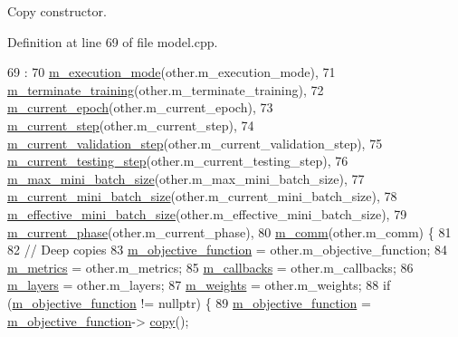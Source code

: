 Copy constructor. 

Definition at line 69 of file model.\+cpp.


\begin{DoxyCode}
69                                :
70   \hyperlink{classlbann_1_1model_a2166e2aad256a335ace3bdcae5da2614}{m\_execution\_mode}(other.m\_execution\_mode),
71   \hyperlink{classlbann_1_1model_a639f9c3fcb81b905085f8b1932f8920f}{m\_terminate\_training}(other.m\_terminate\_training),
72   \hyperlink{classlbann_1_1model_a305fac94b9063e59198c7f936923221a}{m\_current\_epoch}(other.m\_current\_epoch),
73   \hyperlink{classlbann_1_1model_af31a76afc53061747d2170a65e98f692}{m\_current\_step}(other.m\_current\_step),
74   \hyperlink{classlbann_1_1model_af69e5f6bf49a4990fd4c18984705ab87}{m\_current\_validation\_step}(other.m\_current\_validation\_step),
75   \hyperlink{classlbann_1_1model_a2acf043862ba878cb7a91cb0d26c3791}{m\_current\_testing\_step}(other.m\_current\_testing\_step),
76   \hyperlink{classlbann_1_1model_acc496503e7cf8d635e5a31ba09b3c81a}{m\_max\_mini\_batch\_size}(other.m\_max\_mini\_batch\_size),
77   \hyperlink{classlbann_1_1model_a982cea92d230bab5a47df504f02daf98}{m\_current\_mini\_batch\_size}(other.m\_current\_mini\_batch\_size),
78   \hyperlink{classlbann_1_1model_a4887fd2816e7c51b24cb8bf8e4a80a1c}{m\_effective\_mini\_batch\_size}(other.m\_effective\_mini\_batch\_size),
79   \hyperlink{classlbann_1_1model_a150ef033f81982936e007b10c421f488}{m\_current\_phase}(other.m\_current\_phase),
80   \hyperlink{classlbann_1_1model_a0eabaf2b2f829fd5db3dfd26df420df0}{m\_comm}(other.m\_comm) \{
81 
82   \textcolor{comment}{// Deep copies}
83   \hyperlink{classlbann_1_1model_a24c50e7108dd7698671aed7df5b22e8b}{m\_objective\_function} = other.m\_objective\_function;
84   \hyperlink{classlbann_1_1model_ae75c9aafe9e5a93980cc1bbae986bc79}{m\_metrics}            = other.m\_metrics;
85   \hyperlink{classlbann_1_1model_a07b511fef30368494c2ad80922ffd0eb}{m\_callbacks}          = other.m\_callbacks;
86   \hyperlink{classlbann_1_1model_a0229fc226ec163d1411548446104569d}{m\_layers}             = other.m\_layers;
87   \hyperlink{classlbann_1_1model_aaf9adefe4497d90bf5bc2567e71bfb00}{m\_weights}            = other.m\_weights;
88   \textcolor{keywordflow}{if} (\hyperlink{classlbann_1_1model_a24c50e7108dd7698671aed7df5b22e8b}{m\_objective\_function} != \textcolor{keyword}{nullptr}) \{
89     \hyperlink{classlbann_1_1model_a24c50e7108dd7698671aed7df5b22e8b}{m\_objective\_function} = \hyperlink{classlbann_1_1model_a24c50e7108dd7698671aed7df5b22e8b}{m\_objective\_function}->
      \hyperlink{classlbann_1_1objective__function_a8ab03f0dc1d2c067b895f5859bacd810}{copy}();

\end{DoxyCode}
